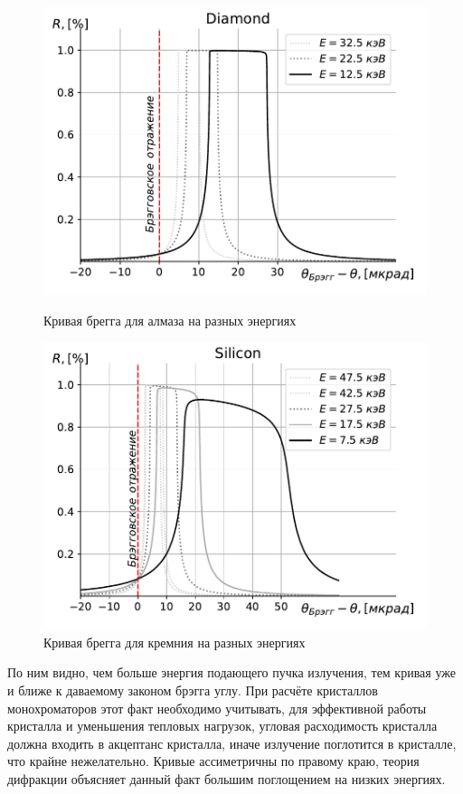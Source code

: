 \begin{figure}
	\centering  
	\begin{minipage}{0.49\textwidth}
		\centering
		\includegraphics[width=\textwidth]{pic/Diamond_bragg_R.pdf}
		\caption{Кривая брегга для алмаза на разных энергиях}
		\label{fig:bragg_R}
	\end{minipage}\hfill
	\begin{minipage}{0.49\textwidth}
		\centering
		\includegraphics[width=\textwidth]{pic/Silicon_bragg_R.pdf}
		\caption{Кривая брегга для кремния на разных энергиях}
		\label{fig:bragg_T}
	\end{minipage}    
\end{figure}
По ним видно, чем больше энергия подающего пучка излучения, тем  кривая уже и ближе к даваемому законом брэгга углу. При расчёте кристаллов монохроматоров этот факт необходимо учитывать, для эффективной работы кристалла и уменьшения тепловых нагрузок, угловая расходимость кристалла должна входить в акцептанс кристалла, иначе излучение поглотится в кристалле, что крайне нежелательно. Кривые ассиметричны по правому краю, теория дифракции объясняет данный факт большим поглощением на низких энергиях.

